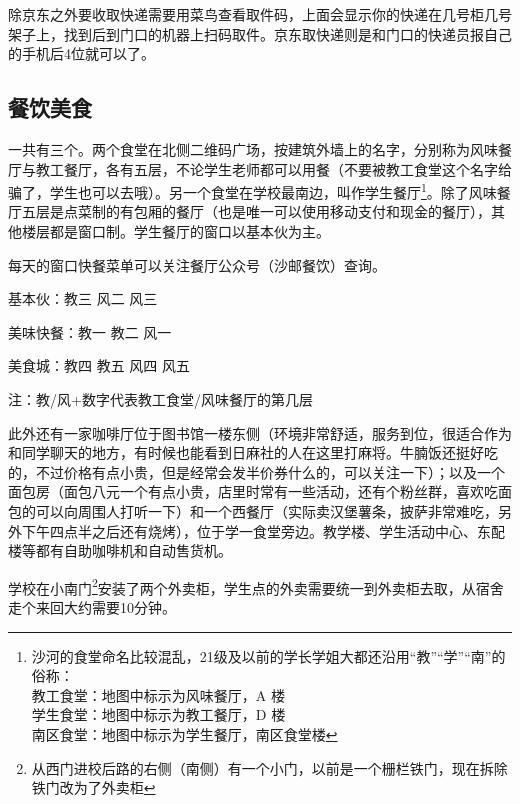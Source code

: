 除京东之外要收取快递需要用菜鸟查看取件码，上面会显示你的快递在几号柜几号架子上，找到后到门口的机器上扫码取件。京东取快递则是和门口的快递员报自己的手机后4位就可以了。

\subsection{餐饮美食}


一共有三个。两个食堂在北侧二维码广场，按建筑外墙上的名字，分别称为风味餐厅与教工餐厅，各有五层，不论学生老师都可以用餐（不要被教工食堂这个名字给骗了，学生也可以去哦）。另一个食堂在学校最南边，叫作学生餐厅\footnote{沙河的食堂命名比较混乱，21级及以前的学长学姐大都还沿用“教”“学”“南”的俗称：\\\hspace*{4em}教工食堂：地图中标示为风味餐厅，A 楼\\\hspace*{4em}学生食堂：地图中标示为教工餐厅，D 楼\\\hspace*{4em}南区食堂：地图中标示为学生餐厅，南区食堂楼}。除了风味餐厅五层是点菜制的有包厢的餐厅（也是唯一可以使用移动支付和现金的餐厅），其他楼层都是窗口制。学生餐厅的窗口以基本伙为主。

每天的窗口快餐菜单可以关注餐厅公众号（沙邮餐饮）查询。

基本伙：教三 风二 风三

美味快餐：教一 教二 风一

美食城：教四 教五 风四 风五

注：教/风+数字代表教工食堂/风味餐厅的第几层

此外还有一家咖啡厅位于图书馆一楼东侧（环境非常舒适，服务到位，很适合作为和同学聊天的地方，有时候也能看到日麻社的人在这里打麻将。牛腩饭还挺好吃的，不过价格有点小贵，但是经常会发半价券什么的，可以关注一下）；以及一个面包房（面包八元一个有点小贵，店里时常有一些活动，还有个粉丝群，喜欢吃面包的可以向周围人打听一下）和一个西餐厅（实际卖汉堡薯条，披萨非常难吃，另外下午四点半之后还有烧烤），位于学一食堂旁边。教学楼、学生活动中心、东配楼等都有自助咖啡机和自动售货机。


学校在小南门\footnote{从西门进校后路的右侧（南侧）有一个小门，以前是一个栅栏铁门，现在拆除铁门改为了外卖柜}安装了两个外卖柜，学生点的外卖需要统一到外卖柜去取，从宿舍走个来回大约需要10分钟。


